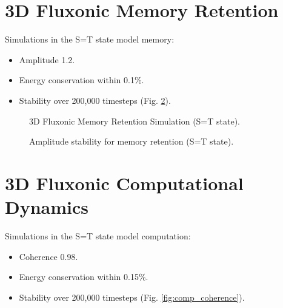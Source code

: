 \documentclass[11pt]{article}
\begin{document}
\section{3D Fluxonic Memory Retention}
Simulations in the S=T state model memory:
\begin{itemize}
    \item Amplitude 1.2.
    \item Energy conservation within 0.1\%.
    \item Stability over 200,000 timesteps (Fig. \ref{fig:mem_stab}).
\end{itemize}

\begin{figure}[ht]
    \centering
    \caption{3D Fluxonic Memory Retention Simulation (S=T state).}
    \label{fig:3Dmem}
\end{figure}

\begin{figure}[ht]
    \centering
    \caption{Amplitude stability for memory retention (S=T state).}
    \label{fig:mem_stab}
\end{figure}

\section{3D Fluxonic Computational Dynamics}
Simulations in the S=T state model computation:
\begin{itemize}
    \item Coherence 0.98.
    \item Energy conservation within 0.15\%.
    \item Stability over 200,000 timesteps (Fig. \ref{fig:comp_coherence}).
\end{itemize}
\end{document}
